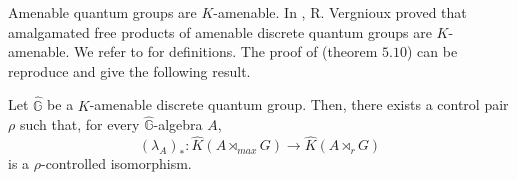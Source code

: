 Amenable quantum groups are $K$-amenable. In \cite{VergniouxKamenability}, R. Vergnioux proved that amalgamated free products of amenable discrete quantum groups are $K$-amenable. We refer to \cite{VergniouxKamenability} for definitions. The proof of \cite{OY2} (theorem $5.10$) can be reproduce and give the following result.

\begin{prop}
Let $\hat{\mathbb G}$ be a $K$-amenable discrete quantum group. Then, there exists a control pair $\rho$ such that, for every $\hat{\mathbb G}$-algebra $A$,
\[(\lambda_A)_* : \hat K(A\rtimes_{max} G) \rightarrow \hat K(A\rtimes_r G) \]
is a $\rho$-controlled isomorphism.
\end{prop}





























   
